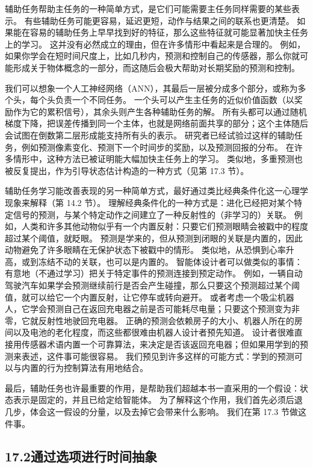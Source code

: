 \documentclass[UTF8, 12pt, fontset=fandol, oneside]{ctexart}
\begin{document}
辅助任务帮助主任务的一种简单方式，是它们可能需要主任务同样需要的某些表示。
有些辅助任务可能更容易，延迟更短，动作与结果之间的联系也更清楚。
如果能在容易的辅助任务上早早找到好的特征，那么这些特征就可能显著加快主任务上的学习。
这并没有必然成立的理由，但在许多情形中看起来是合理的。
例如，如果你学会在短时间尺度上，比如几秒内，预测和控制自己的传感器，那么你就可能形成关于物体概念的一部分，而这随后会极大帮助对长期奖励的预测和控制。

我们可以想象一个人工神经网络（ANN），其最后一层被分成多个部分，或称为多个头，每个头负责一个不同任务。
一个头可以产生主任务的近似价值函数（以奖励作为它的累积信号），其余头则产生各种辅助任务的解。
所有头都可以通过随机梯度下降，把误差传播到同一个主体，也就是网络前面共享的部分；这个主体随后会试图在倒数第二层形成能支持所有头的表示。
研究者已经试验过这样的辅助任务，例如预测像素变化、预测下一个时间步的奖励，以及预测回报的分布。
在许多情形中，这种方法已被证明能大幅加快主任务上的学习。
类似地，多重预测也被反复提出，作为引导状态估计构造的一种方式（见第 17.3 节）。

辅助任务学习能改善表现的另一种简单方式，最好通过类比经典条件化这一心理学现象来解释（第 14.2 节）。
理解经典条件化的一种方式是：进化已经把对某个特定信号的预测，与某个特定动作之间建立了一种反射性的（非学习的）关联。
例如，人类和许多其他动物似乎有一个内置反射：只要它们预测眼睛会被戳中的程度超过某个阈值，就眨眼。
预测是学来的，但从预测到闭眼的关联是内置的，因此动物避免了许多眼睛在无保护状态下被戳中的情形。
类似地，从恐惧到心率升高，或到冻结不动的关联，也可以是内置的。
智能体设计者可以做类似的事情：有意地（不通过学习）把关于特定事件的预测连接到预定动作。
例如，一辆自动驾驶汽车如果学会预测继续前行是否会产生碰撞，那么只要这个预测超过某个阈值，就可以给它一个内置反射，让它停车或转向避开。
或者考虑一个吸尘机器人，它学会预测自己在返回充电器之前是否可能耗尽电量；只要这个预测变为非零，它就反射性地驶回充电器。
正确的预测会依赖房子的大小、机器人所在的房间以及电池的老化程度，而这些都很难由机器人设计者预先知道。
设计者很难直接用传感器术语内置一个可靠算法，来决定是否该返回充电器；但如果用学到的预测来表述，这件事可能很容易。
我们预见到许多这样的可能方式：学到的预测可以与内置的行为控制算法有用地结合。

最后，辅助任务也许最重要的作用，是帮助我们超越本书一直采用的一个假设：状态表示是固定的，并且已给定给智能体。
为了解释这个作用，我们首先必须后退几步，体会这一假设的分量，以及去掉它会带来什么影响。
我们在第 17.3 节做这件事。

\subsection*{17.2\quad 通过选项进行时间抽象}
\end{document}

